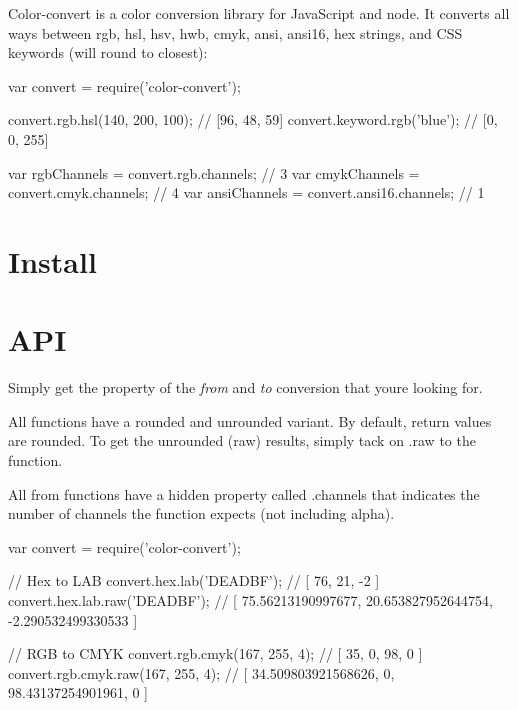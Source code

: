 \href{https://travis-ci.org/Qix-/color-convert}{\tt }

Color-\/convert is a color conversion library for Java\+Script and node. It converts all ways between {\ttfamily rgb}, {\ttfamily hsl}, {\ttfamily hsv}, {\ttfamily hwb}, {\ttfamily cmyk}, {\ttfamily ansi}, {\ttfamily ansi16}, {\ttfamily hex} strings, and C\+SS {\ttfamily keyword}s (will round to closest)\+:


\begin{DoxyCode}
var convert = require('color-convert');

convert.rgb.hsl(140, 200, 100);             // [96, 48, 59]
convert.keyword.rgb('blue');                // [0, 0, 255]

var rgbChannels = convert.rgb.channels;     // 3
var cmykChannels = convert.cmyk.channels;   // 4
var ansiChannels = convert.ansi16.channels; // 1
\end{DoxyCode}


\section*{Install}




\section*{A\+PI}

Simply get the property of the {\itshape from} and {\itshape to} conversion that you\textquotesingle{}re looking for.

All functions have a rounded and unrounded variant. By default, return values are rounded. To get the unrounded (raw) results, simply tack on {\ttfamily .raw} to the function.

All \textquotesingle{}from\textquotesingle{} functions have a hidden property called {\ttfamily .channels} that indicates the number of channels the function expects (not including alpha).


\begin{DoxyCode}
var convert = require('color-convert');

// Hex to LAB
convert.hex.lab('DEADBF');         // [ 76, 21, -2 ]
convert.hex.lab.raw('DEADBF');     // [ 75.56213190997677, 20.653827952644754, -2.290532499330533 ]

// RGB to CMYK
convert.rgb.cmyk(167, 255, 4);     // [ 35, 0, 98, 0 ]
convert.rgb.cmyk.raw(167, 255, 4); // [ 34.509803921568626, 0, 98.43137254901961, 0 ]
\end{DoxyCode}



